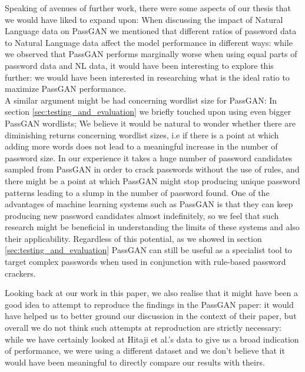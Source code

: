 Speaking of avenues of further work, there were some aspects of our thesis that we would have liked to expand upon:
When discussing the impact of Natural Language data on PassGAN we mentioned that different ratios of password data to Natural Language data affect the model performance in different ways: while we observed 
that PassGAN performs marginally worse when using equal parts of password data and NL data, it would have been interesting to explore this further: we would have been interested in researching what is the ideal ratio to maximize PassGAN performance. \\
A similar argument might be had concerning wordlist size for PassGAN: In section \ref{sec:testing_and_evaluation} we briefly touched upon using even bigger PassGAN wordlists; We believe it would be natural to wonder whether there are diminishing returns concerning wordlist sizes, i.e if there is a point at which adding more words does not lead to a meaningful increase in the number of password size.
In our experience it takes a huge number of password candidates sampled from PassGAN in order to crack passwords without the use of rules, and there might be a point at which PassGAN might stop producing 
unique password patterns leading to a slump in the number of password found. One of the advantages of machine learning systems such as PassGAN is that they can keep producing new password candidates almost 
indefinitely, so we feel that such research might be beneficial in understanding the limits of these systems and also their applicability. Regardless of this potential, as we showed in section 
\ref{sec:testing_and_evaluation} PassGAN can still be useful as a specialist tool to target complex passwords when used in conjunction with rule-based password crackers.

Looking back at our work in this paper, we also realise that it might have been a good idea to attempt to reproduce the findings in the PassGAN paper: it would have helped us to better ground our discussion 
in the context of their paper, but overall we do not think such attempts at reproduction are strictly necessary: while we have certainly looked at Hitaji et al.'s data to give us a broad indication of performance, we were using a different dataset and we don't believe that it would have been meaningful to directly compare our results with theirs.

  
